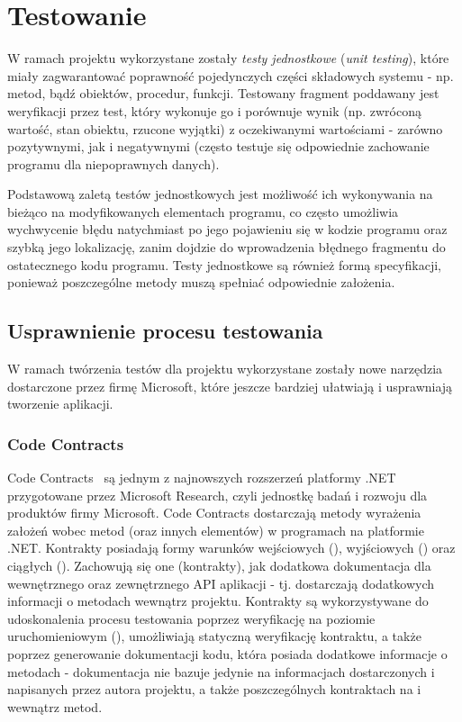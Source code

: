 \section{Testowanie}
W ramach projektu wykorzystane zostały \emph{testy jednostkowe} (\emph{unit testing}), które miały zagwarantować poprawność pojedynczych części składowych systemu - np. metod, bądź obiektów, procedur, funkcji. Testowany fragment poddawany jest weryfikacji przez test, który wykonuje go i porównuje wynik (np. zwróconą wartość, stan obiektu, rzucone wyjątki) z oczekiwanymi wartościami - zarówno pozytywnymi, jak i negatywnymi (często testuje się odpowiednie zachowanie programu dla niepoprawnych danych). 

Podstawową zaletą testów jednostkowych jest możliwość ich wykonywania na bieżąco na modyfikowanych elementach programu, co często umożliwia wychwycenie błędu natychmiast po jego pojawieniu się w kodzie programu oraz szybką jego lokalizację, zanim dojdzie do wprowadzenia błędnego fragmentu do ostatecznego kodu programu. Testy jednostkowe są również formą specyfikacji, ponieważ poszczególne metody muszą spełniać odpowiednie założenia. 

\subsection{Usprawnienie procesu testowania}
W ramach twórzenia testów dla projektu wykorzystane zostały nowe narzędzia dostarczone przez firmę Microsoft, które jeszcze bardziej ułatwiają i usprawniają tworzenie aplikacji.

\subsubsection{Code Contracts}
Code Contracts~\cite{ms:codecontracts} są jednym z najnowszych rozszerzeń platformy .NET przygotowane przez Microsoft Research, czyli jednostkę badań i rozwoju dla produktów firmy Microsoft. Code Contracts dostarczają metody wyrażenia założeń wobec metod (oraz innych elementów) w programach na platformie .NET. Kontrakty posiadają formy warunków wejściowych (), wyjściowych () oraz ciągłych (). Zachowują się one (kontrakty), jak dodatkowa dokumentacja dla wewnętrznego oraz zewnętrznego API aplikacji - tj. dostarczają dodatkowych informacji o metodach wewnątrz projektu. Kontrakty są wykorzystywane do udoskonalenia procesu testowania poprzez weryfikację na poziomie uruchomieniowym (), umożliwiają statyczną weryfikację kontraktu, a także poprzez generowanie dokumentacji kodu, która posiada dodatkowe informacje o metodach - dokumentacja nie bazuje jedynie na informacjach dostarczonych i napisanych przez autora projektu, a także poszczególnych kontraktach na i wewnątrz metod.

